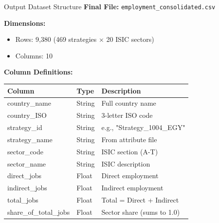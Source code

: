 \documentclass[10pt]{beamer}
\begin{document}

\begin{frame}[fragile]{Output Dataset Structure}
\textbf{Final File:} \texttt{employment\_consolidated.csv}

\vspace{0.3cm}

\textbf{Dimensions:}
\begin{itemize}
    \item Rows: 9,380 (469 strategies $\times$ 20 ISIC sectors)
    \item Columns: 10
\end{itemize}

\vspace{0.3cm}

\textbf{Column Definitions:}

\vspace{0.2cm}

\begin{table}[h]
\centering
\footnotesize
\begin{tabular}{lll}
\toprule
\textbf{Column} & \textbf{Type} & \textbf{Description} \\
\midrule
country\_name & String & Full country name \\
country\_ISO & String & 3-letter ISO code \\
strategy\_id & String & e.g., "Strategy\_1004\_EGY" \\
strategy\_name & String & From attribute file \\
sector\_code & String & ISIC section (A-T) \\
sector\_name & String & ISIC description \\
direct\_jobs & Float & Direct employment \\
indirect\_jobs & Float & Indirect employment \\
total\_jobs & Float & Total = Direct + Indirect \\
share\_of\_total\_jobs & Float & Sector share (sums to 1.0) \\
\bottomrule
\end{tabular}
\end{table}

\end{frame}

\end{document}
